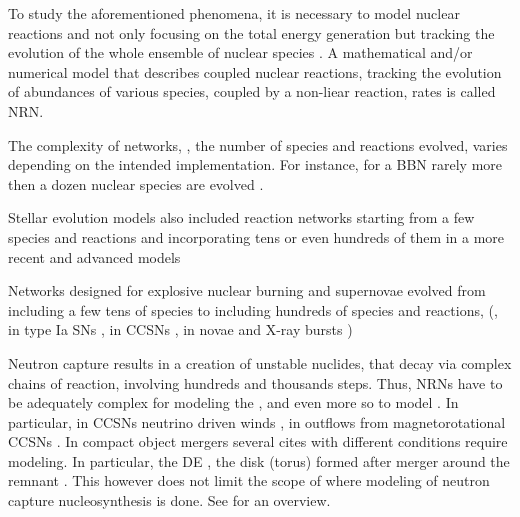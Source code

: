To study the aforementioned phenomena, it is necessary to model nuclear reactions and not only focusing on the total energy generation \citep[\eg][]{Weaver:1978,Mueller:1986,Timmes:1999} but tracking the evolution of the whole ensemble of nuclear species \red{[Refs]}. A mathematical and/or numerical model that describes coupled nuclear reactions, tracking the evolution of abundances of various species, coupled by a non-liear reaction, rates is called \ac{NRN}.

The complexity of networks, \ie, the number of species and reactions evolved, varies depending on the intended implementation. For instance, for a \ac{BBN} rarely more then a dozen nuclear species are evolved 
\citep{Wagoner:1973,Orlov:2000,Nollett:2000fh,Coc:2013eha,Cyburt:2015mya}. 

Stellar evolution models also included reaction networks starting from a few species and reactions \citep[\eg][]{Hayashi:1962,Hofmeister:1964} and incorporating tens or even hundreds of them in a more recent and advanced models \citep{Arnett:1977,Weaver:1978,Paxton:2011,Bressan:2012,Jones:2015}

Networks designed for explosive nuclear burning and supernovae evolved from including a few tens of species \citep[\eg][]{Truran:1966,Truran:1967,Arnett:1969,Woosley:1973} to including hundreds of species and reactions, (\eg, in type Ia \acp{SN} \citep{Thielemann:1986,Hillebrandt:2013gna,Seitenzahl:2013,Leung:2015fxa}, in \acp{CCSN} \citep{Thielemann:1986,Limongi:2003ui,Heger:2008td,Harris:2014}, in novae \citep{Weiss:1990,Jose:1997vf,Iliadis:2002zz,Starrfield:2016} and X-ray bursts \citep{Schatz:2001xx,Woosley:2003cd,Cyburt:2010,Parikh:2012hx}) 

Neutron capture results in a creation of unstable nuclides, that decay via complex chains of reaction, involving hundreds and thousands steps. Thus, \acp{NRN} have to be adequately complex for modeling the \sproc{}, \citep[\eg][]{Prantzos:1990,Kaeppeler:2011,Nishimura:2017zdi} and even more so to model \rproc{}. In particular, in \acp{CCSN} neutrino driven winds \citep[\eg][]{Woosley:1992,Arcones:2010,Wanajo:2013}, in outflows from magnetorotational \acp{CCSN} \citep[\eg][]{Winteler:2012,Nishimura:2015nca}.
In compact object mergers several cites with different conditions require modeling. In particular, the \ac{DE} \citep{Goriely:2011vg,Bauswein:2013yna,Wanajo:2014wha,Just:2014fka,Fernandez:2016sbf}\red{[Refs]}, the disk (torus) formed after merger around the remnant \citep{Surman:2008qf,Perego:2014fma,Martin:2015hxa,Lippuner:2017tyn}\red{[Refs]}. This however does not limit the scope of where modeling of neutron capture nucleosynthesis is done. See \citep{Blinnikov:1996,Panov:1995,Panov:2001,Mumpower:2011ar}\red{[Refs]} for an overview.

